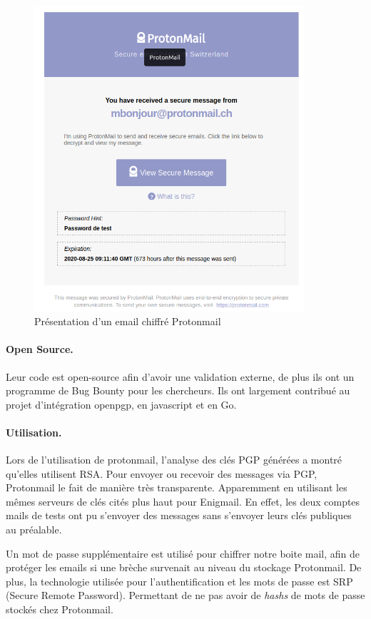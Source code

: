 \begin{figure}[h!]
	\includegraphics[width=10cm]{images/protonmailPresentation.png}
	\centering
	\caption{Présentation d'un email chiffré Protonmail}
	\label{fig:ProtonmailPres}
\end{figure}

\paragraph*{Open Source.}
Leur code est open-source afin d'avoir une validation externe, de plus ils ont un programme de Bug Bounty pour les chercheurs. Ils ont largement contribué au projet d'intégration openpgp, en javascript et en Go.

\paragraph*{Utilisation.}
Lors de l'utilisation de protonmail, l'analyse des clés PGP générées a montré qu'elles utilisent RSA. Pour envoyer ou recevoir des messages via PGP, Protonmail le fait de manière très transparente. Apparemment en utilisant les mêmes serveurs de clés cités plus haut pour Enigmail. En effet, les deux comptes mails de tests ont pu s'envoyer des messages sans s'envoyer leurs clés publiques au préalable.

Un mot de passe supplémentaire est utilisé pour chiffrer notre boite mail, afin de protéger les emails si une brèche survenait au niveau du stockage Protonmail. De plus, la technologie utilisée pour l'authentification et les mots de passe est SRP (Secure Remote Password). Permettant de ne pas avoir de \textit{hashs} de mots de passe stockés chez Protonmail.

